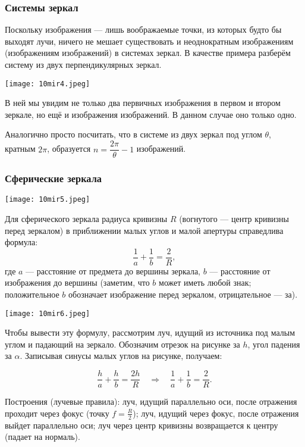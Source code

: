 \documentclass[12pt, a4paper]{article}%
\begin{document}
\subsubsection*{Системы зеркал}

Поскольку изображения --- лишь воображаемые точки, из которых будто бы выходят лучи, ничего не мешает существовать и неоднократным изображениям (изображениям изображений) в системах зеркал. В качестве примера разберём систему из двух перпендикулярных зеркал. 

\begin{center}
\texttt{[image: 10mir4.jpeg]}
\label{fig:mpr}
\end{center}

В ней мы увидим не только два первичных изображения в первом и втором зеркале, но ещё и изображения изображений. В данном случае оно только одно. 

Аналогично просто посчитать, что в системе из двух зеркал под углом $\theta$, кратным $2\pi$, образуется $n = \dfrac{2\pi}{\theta}-1$ изображений.

\subsubsection*{Сферические зеркала}

\begin{center}
\texttt{[image: 10mir5.jpeg]}
\label{fig:mpr}
\end{center}

Для сферического зеркала радиуса кривизны $R$ (вогнутого — центр кривизны перед зеркалом) в приближении малых углов и малой апертуры справедлива формула:
\[
\frac{1}{a}+\frac{1}{b}=\frac{2}{R},
\]
где $a$ — расстояние от предмета до вершины зеркала, $b$ — расстояние от изображения до вершины
(заметим, что $b$ может иметь любой знак; положительное $b$ обозначает изображение перед зеркалом, отрицательное --- за).

\begin{center}
\texttt{[image: 10mir6.jpeg]}
\label{fig:mpr}
\end{center}

Чтобы вывести эту формулу, рассмотрим луч, идущий из источника под малым углом и падающий на зеркало. Обозначим отрезок на рисунке за $h$, угол падения за $\alpha$. Записывая синусы малых углов на рисунке, получаем:

\[
\frac{h}{a}+\frac{h}{b}=\frac{2h}{R}\quad \Longrightarrow\quad \frac{1}{a}+\frac{1}{b}=\frac{2}{R}.
\]

Построения (лучевые правила): луч, идущий параллельно оси, после отражения проходит через фокус (точку $f = \frac{R}{2}$); луч, идущий через фокус, после отражения выйдет параллельно оси; луч через центр кривизны возвращается к центру (падает на нормаль).
\end{document}
